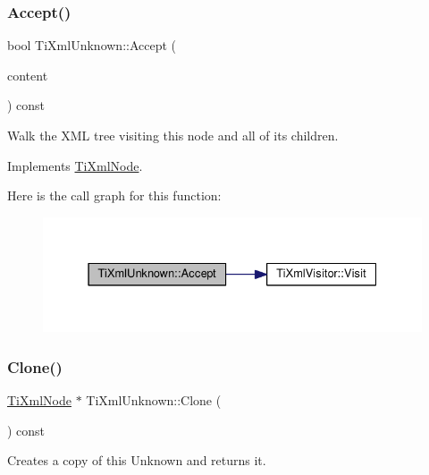 \subsubsection{\texorpdfstring{Accept()}{Accept()}}
{\footnotesize\ttfamily bool Ti\+Xml\+Unknown\+::\+Accept (\begin{DoxyParamCaption}\item[{\hyperlink{class_ti_xml_visitor}{Ti\+Xml\+Visitor} $\ast$}]{content }\end{DoxyParamCaption}) const\hspace{0.3cm}{\ttfamily [virtual]}}

Walk the X\+ML tree visiting this node and all of its children. 

Implements \hyperlink{class_ti_xml_node_acc0f88b7462c6cb73809d410a4f5bb86}{Ti\+Xml\+Node}.

Here is the call graph for this function\+:\nopagebreak
\begin{figure}[H]
\begin{center}
\leavevmode
\includegraphics[width=331pt]{class_ti_xml_unknown_aafdf1b2d4f561979c7907bad91004999_cgraph}
\end{center}
\end{figure}
\mbox{\label{class_ti_xml_unknown_a3dea7689de5b1931fd6657992948fde0}} 
\subsubsection{\texorpdfstring{Clone()}{Clone()}}
{\footnotesize\ttfamily \hyperlink{class_ti_xml_node}{Ti\+Xml\+Node} $\ast$ Ti\+Xml\+Unknown\+::\+Clone (\begin{DoxyParamCaption}{ }\end{DoxyParamCaption}) const\hspace{0.3cm}{\ttfamily [virtual]}}



Creates a copy of this Unknown and returns it. 



